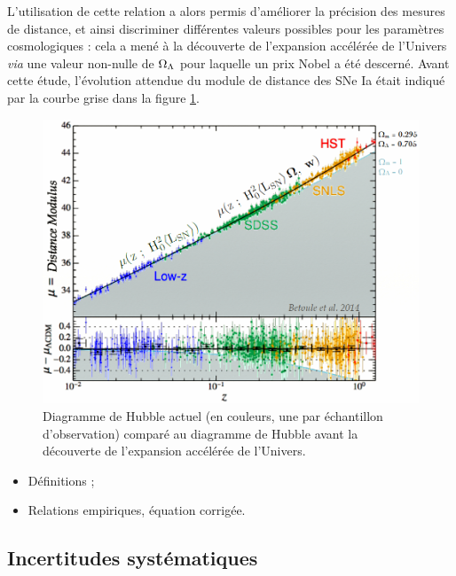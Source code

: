 \documentclass[a4paper, 12pt, svgnames]{article}
\begin{document}
L'utilisation de cette relation a alors permis d'améliorer la précision des
mesures de distance, et ainsi discriminer différentes valeurs possibles pour les
paramètres cosmologiques : cela a mené à la découverte de l'expansion accélérée
de l'Univers \textit{via} une valeur non-nulle de $\Omega_\Lambda$ pour laquelle un prix
Nobel a été descerné. Avant cette étude, l'évolution attendue du module de
distance des SNe Ia était indiqué par la courbe grise dans la figure
\ref{hub_acc_exp}.

\begin{figure}[htbp!]
    \centering
    \includegraphics[width=.5\linewidth]{Rapport_figures/bet_al_2.PNG}
    \captionsetup{justification=centering}
    \caption{Diagramme de Hubble actuel (en couleurs, une par échantillon
             d'observation) comparé au diagramme de Hubble avant la découverte 
             de l'expansion accélérée de l'Univers.}
    \label{hub_acc_exp}
\end{figure}

\begin{itemize}
    \item Définitions ;
    \item Relations empiriques, équation corrigée.
\end{itemize}

\subsection{Incertitudes systématiques}
\end{document}
